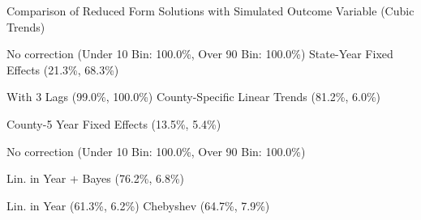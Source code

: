 \caption{Comparison of Reduced Form Solutions with Simulated Outcome Variable (Cubic Trends) \label{fig:distributions-existing-solutions}}
\caption*{\color{p1line}{\textbf{\textemdash\textemdash}} No correction (Under 10 Bin: 100.0\%, Over 90 Bin: 100.0\%) \hspace{1cm} \color{p2line}{- - -} State-Year Fixed Effects (21.3\%, 68.3\%)}
\caption*{\color{p3line}{\textbf{- - -}} With 3 Lags (99.0\%, 100.0\%) \hspace{1cm} \color{p4line}{\textbf{- - -}} County-Specific Linear Trends (81.2\%, 6.0\%)}
\caption*{\color{p5line}{\textbf{- - -}} County-5 Year Fixed Effects (13.5\%, 5.4\%)}


\caption*{\color{p1line}{\textbf{\textemdash\textemdash}} No correction (Under 10 Bin: 100.0\%, Over 90 Bin: 100.0\%)}
\caption*{\color{p2line}{\textbf{- - -}} Lin. in Year + Bayes (76.2\%, 6.8\%)}
\caption*{\color{p3line}{\textbf{- - -}} Lin. in Year (61.3\%, 6.2\%) \hspace{1cm} \color{p4line}{\textbf{- - -}} Chebyshev (64.7\%, 7.9\%)}